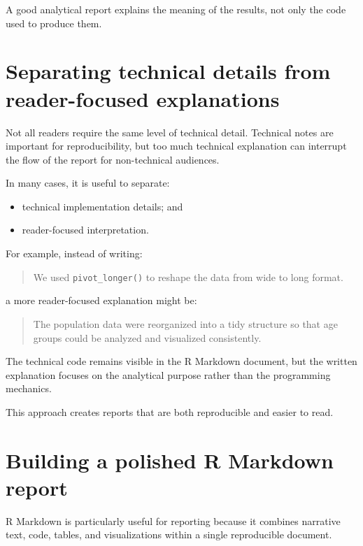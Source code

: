 \documentclass[
  11pt,
  oneside]{book}
\providecommand{\tightlist}{%
  \setlength{\itemsep}{0pt}\setlength{\parskip}{0pt}}
\begin{document}
A good analytical report explains the meaning of the results, not only the code used to produce them.

\section{Separating technical details from reader-focused explanations}\label{separating-technical-details-from-reader-focused-explanations}

Not all readers require the same level of technical detail. Technical notes are important for reproducibility, but too much technical explanation can interrupt the flow of the report for non-technical audiences.

In many cases, it is useful to separate:

\begin{itemize}
\tightlist
\item
  technical implementation details; and
\item
  reader-focused interpretation.
\end{itemize}

For example, instead of writing:

\begin{quote}
We used \texttt{pivot\_longer()} to reshape the data from wide to long format.
\end{quote}

a more reader-focused explanation might be:

\begin{quote}
The population data were reorganized into a tidy structure so that age groups could be analyzed and visualized consistently.
\end{quote}

The technical code remains visible in the R Markdown document, but the written explanation focuses on the analytical purpose rather than the programming mechanics.

This approach creates reports that are both reproducible and easier to read.

\section{Building a polished R Markdown report}\label{building-a-polished-r-markdown-report}

R Markdown is particularly useful for reporting because it combines narrative text, code, tables, and visualizations within a single reproducible document.
\end{document}
